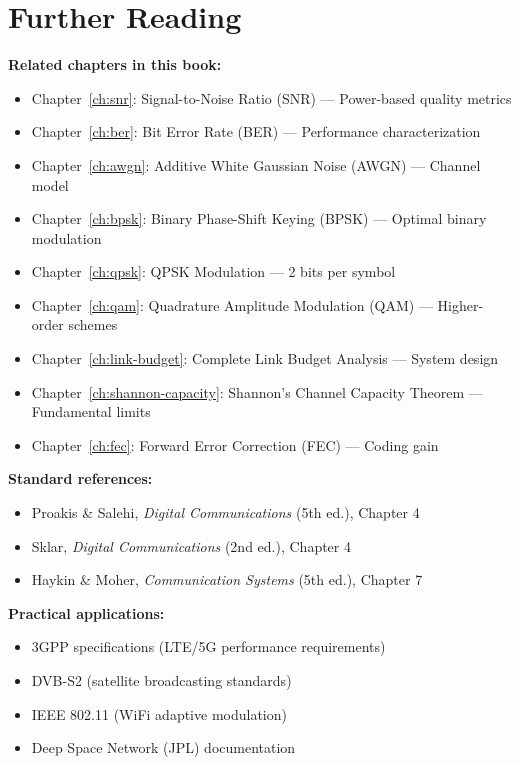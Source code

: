 \section{Further Reading}

\textbf{Related chapters in this book:}
\begin{itemize}
\item Chapter~\ref{ch:snr}: Signal-to-Noise Ratio (SNR) --- Power-based quality metrics
\item Chapter~\ref{ch:ber}: Bit Error Rate (BER) --- Performance characterization
\item Chapter~\ref{ch:awgn}: Additive White Gaussian Noise (AWGN) --- Channel model
\item Chapter~\ref{ch:bpsk}: Binary Phase-Shift Keying (BPSK) --- Optimal binary modulation
\item Chapter~\ref{ch:qpsk}: QPSK Modulation --- 2 bits per symbol
\item Chapter~\ref{ch:qam}: Quadrature Amplitude Modulation (QAM) --- Higher-order schemes
\item Chapter~\ref{ch:link-budget}: Complete Link Budget Analysis --- System design
\item Chapter~\ref{ch:shannon-capacity}: Shannon's Channel Capacity Theorem --- Fundamental limits
\item Chapter~\ref{ch:fec}: Forward Error Correction (FEC) --- Coding gain
\end{itemize}

\textbf{Standard references:}
\begin{itemize}
\item Proakis \& Salehi, \textit{Digital Communications} (5th ed.), Chapter 4
\item Sklar, \textit{Digital Communications} (2nd ed.), Chapter 4
\item Haykin \& Moher, \textit{Communication Systems} (5th ed.), Chapter 7
\end{itemize}

\textbf{Practical applications:}
\begin{itemize}
\item 3GPP specifications (LTE/5G performance requirements)
\item DVB-S2 (satellite broadcasting standards)
\item IEEE 802.11 (WiFi adaptive modulation)
\item Deep Space Network (JPL) documentation
\end{itemize}
